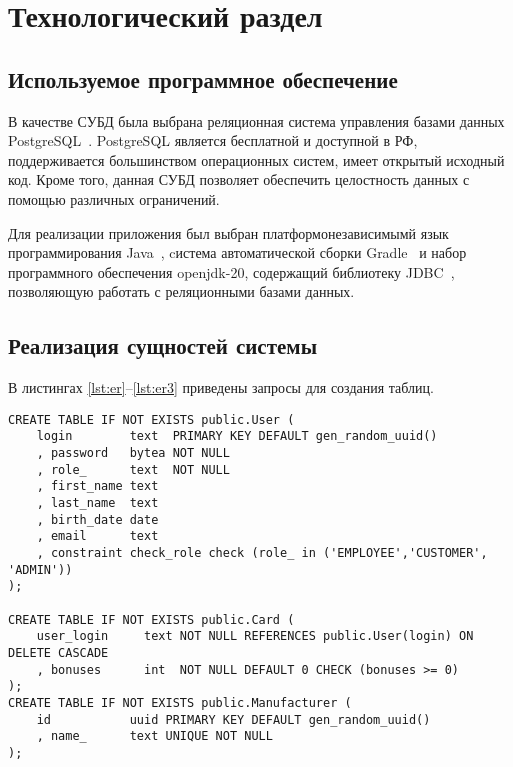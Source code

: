 \chapter{Технологический раздел}

\section{Используемое программное обеспечение}
В качестве СУБД была выбрана реляционная система управления базами
данных PostgreSQL~\cite{postgres}.
PostgreSQL является бесплатной и доступной в РФ, поддерживается большинством операционных систем, имеет открытый исходный код.
Кроме того, данная СУБД позволяет обеспечить целостность данных с помощью различных ограничений.

Для реализации приложения был выбран платформонезависимымй язык программирования Java~\cite{java}, cистема автоматической сборки Gradle~\cite{gradle} и набор программного обеспечения \mbox{openjdk-20}, содержащий библиотеку JDBC~\cite{jdbc}, позволяющую работать с реляционными базами данных.

\section{Реализация сущностей системы}
В листингах \ref{lst:er}--\ref{lst:er3} приведены запросы для создания таблиц.

\begin{lstlisting}[label=lst:er,caption=Запросы для создания таблиц (часть 1)]
CREATE TABLE IF NOT EXISTS public.User (
	login 	     text  PRIMARY KEY DEFAULT gen_random_uuid()
	, password   bytea NOT NULL
	, role_      text  NOT NULL
	, first_name text
	, last_name  text
	, birth_date date
	, email      text
	, constraint check_role check (role_ in ('EMPLOYEE','CUSTOMER', 'ADMIN'))
);

CREATE TABLE IF NOT EXISTS public.Card (
	user_login     text NOT NULL REFERENCES public.User(login) ON DELETE CASCADE
	, bonuses 	   int  NOT NULL DEFAULT 0 CHECK (bonuses >= 0)
);
CREATE TABLE IF NOT EXISTS public.Manufacturer (
	id           uuid PRIMARY KEY DEFAULT gen_random_uuid()
	, name_      text UNIQUE NOT NULL
);
\end{lstlisting}

